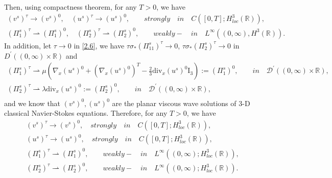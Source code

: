 \documentclass[10pt,reqno]{amsart}
\numberwithin{equation}{section}
\newcommand{\ddiv}{\mathrm{div}}
\begin{document}
Then, using compactness theorem, for any $T>0$, we have
\[
\begin{aligned}
( v^s)^{\tau}\rightarrow (v^s)^0,\quad( u^s)^{\tau}\rightarrow( u^s)^0,\qquad strongly\quad in \quad C([0,T]; H_{loc}^3(\mathbb R)),\\
( \Pi_1^s)^{\tau}\rightharpoonup( \Pi_1^s)^0, \quad( \Pi_2^s)^{\tau}\rightharpoonup( \Pi_2^s)^0,
\qquad weakly-\quad in \quad L^\infty((0,\infty), H^3(\mathbb R)).
\end{aligned}
\]
In addition, let $\tau\rightarrow0$ in \eqref{2.6}, we have $\tau\sigma_{\ast} (\Pi^s_{11})^\tau\rightarrow 0$, $\tau\sigma_{\ast} (\Pi^s_2)^\tau\rightarrow 0$ in $D^\prime((0,\infty)\times \mathbb R)$ and
\[
\begin{aligned}
( \Pi_1^s)^{\tau}\rightharpoonup\mu\left(\nabla_x (u^s)^0+(\nabla_x (u^s)^0)^T-\frac{2}{3}\ddiv_x(u^s)^0 \mathrm{I}_3\right)
:=( \Pi_1^s)^{0},\qquad  in \quad \mathcal D^\prime((0,\infty)\times \mathbb R),\\
( \Pi_2^s)^{\tau}\rightharpoonup\lambda\ddiv_x(u^s)^0
:=( \Pi^s_2)^{0},\qquad  in \quad \mathcal D^\prime((0,\infty)\times \mathbb R),\\
\end{aligned}
\]
and we know that $( v^s)^0,( u^s)^0$ are the planar viscous wave solutions of 3-D classical Navier-Stokes equations.
Therefore, for any $T>0$, we have
\begin{equation}\label{5.2}
\begin{aligned}
 (v^s)^{\tau}\rightarrow( v^s)^{0}, \quad strongly\quad in \quad C([0, T]; H_{loc}^3(\mathbb R)),\\
  (u^s)^{\tau}\rightarrow( u^s)^{0}, \quad strongly\quad in \quad C([0, T]; H_{loc}^3(\mathbb R)),\\
   (\Pi^s_1)^{\tau}\rightharpoonup(\Pi_1^s)^{0},\qquad weakly- \quad in \quad L^\infty((0, \infty); H_{loc}^3(\mathbb R)),\\
   (\Pi^s_2)^{\tau}\rightharpoonup(\Pi_2^s)^{0},\qquad weakly- \quad in \quad L^\infty((0, \infty); H_{loc}^3(\mathbb R)).
\end{aligned}
\end{equation}
\end{document}
